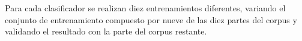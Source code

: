 \documentclass[runningheads,a4paper]{llncs}
\begin{document}
Para cada clasificador se realizan diez entrenamientos diferentes, variando el conjunto de entrenamiento compuesto por nueve de las diez partes del corpus y validando el resultado con la parte del corpus restante. 
\end{document}
